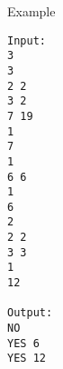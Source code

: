 Example  
\begin{verbatim}
Input:
3
3
2 2
3 2
7 19
1
7
1
6 6
1
6
2
2 2
3 3
1
12

Output:
NO
YES 6
YES 12
\end{verbatim}